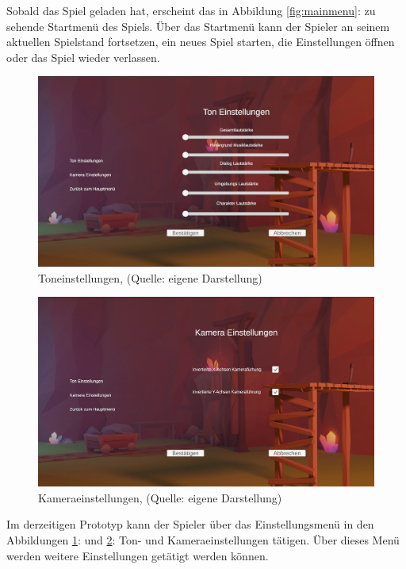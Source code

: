 Sobald das Spiel geladen hat, erscheint das in Abbildung \ref{fig:mainmenu}:  zu sehende Startmenü des Spiels. Über das Startmenü kann der Spieler an seinem aktuellen Spielstand fortsetzen, ein neues Spiel starten, die Einstellungen öffnen oder das Spiel wieder verlassen.

\begin{figure}[ht]
\centering
\includegraphics[width=1\linewidth]{content/pictures/SoundSetting.jpg}
\caption{Toneinstellungen, (Quelle: eigene Darstellung)}
\label{fig:sound_settings}
\end{figure}

\begin{figure}[ht]
\centering
\includegraphics[width=1\linewidth]{content/pictures/CamSetting.jpg}
\caption{Kameraeinstellungen, (Quelle: eigene Darstellung)}
\label{fig:cam_settings}
\end{figure}

Im derzeitigen Prototyp kann der Spieler über das Einstellungsmenü in den Abbildungen \ref{fig:sound_settings}:  und \ref{fig:cam_settings}:  Ton- und Kameraeinstellungen tätigen. Über dieses Menü werden weitere Einstellungen getätigt werden können.

